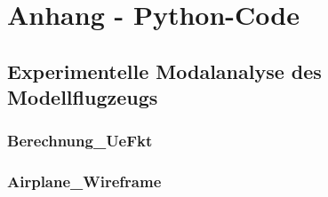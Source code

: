 \chapter*{Anhang - Python-Code}
\label{sec: Anhang}

\appendix

\section{Experimentelle Modalanalyse des Modellflugzeugs}
    \subsection*{Berechnung\_UeFkt}
        
        \newpage

    \subsection*{Airplane\_Wireframe}
        
        \newpage